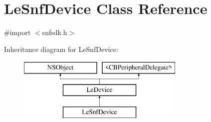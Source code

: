 \hypertarget{interface_le_snf_device}{}\section{Le\+Snf\+Device Class Reference}
\label{interface_le_snf_device}


{\ttfamily \#import $<$snfsdk.\+h$>$}

Inheritance diagram for Le\+Snf\+Device\+:\begin{figure}[H]
\begin{center}
\leavevmode
\includegraphics[height=3.000000cm]{interface_le_snf_device}
\end{center}
\end{figure}
